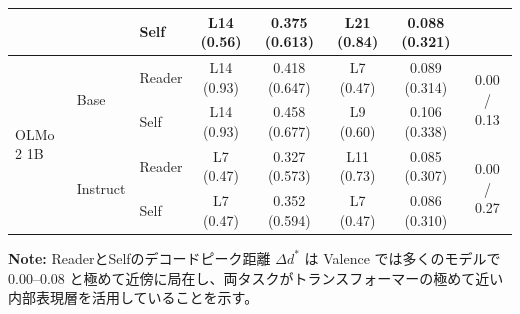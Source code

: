 \begin{table}[htbp]
\begin{tabular}{lll cccc c}
                       &                      & Self   & L14 (0.56) & 0.375 (0.613) & L21 (0.84) & 0.088 (0.321) & \\
\midrule
\multirow{4}{*}{OLMo 2 1B} & \multirow{2}{*}{Base} & Reader & L14 (0.93) & 0.418 (0.647) & L7 (0.47) & 0.089 (0.314) & \multirow{2}{*}{0.00 / 0.13} \\
                       &                      & Self   & L14 (0.93) & 0.458 (0.677) & L9 (0.60) & 0.106 (0.338) & \\
\cmidrule(lr){2-8}
                       & \multirow{2}{*}{Instruct} & Reader & L7 (0.47) & 0.327 (0.573) & L11 (0.73) & 0.085 (0.307) & \multirow{2}{*}{0.00 / 0.27} \\
                       &                      & Self   & L7 (0.47) & 0.352 (0.594) & L7 (0.47) & 0.086 (0.310) & \\
\bottomrule
\end{tabular}
\vspace{1ex}
\begin{minipage}{\linewidth}
\footnotesize
\textbf{Note:} ReaderとSelfのデコードピーク距離 $\Delta d^*$ は Valence では多くのモデルで 0.00--0.08 と極めて近傍に局在し、両タスクがトランスフォーマーの極めて近い内部表現層を活用していることを示す。
\end{minipage}
\end{table}